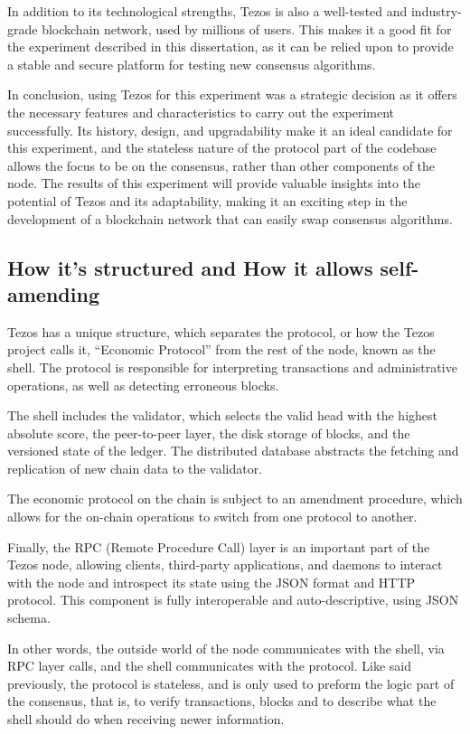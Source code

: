 In addition to its technological strengths, Tezos is also a well-tested and industry-grade blockchain network, used by millions of users. This makes it a good fit for the experiment described in this dissertation, as it can be relied upon to provide a stable and secure platform for testing new consensus algorithms.


In conclusion, using Tezos for this experiment was a strategic decision as it offers the necessary features and characteristics to carry out the experiment successfully. Its history, design, and upgradability make it an ideal candidate for this experiment, and the stateless nature of the protocol part of the codebase allows the focus to be on the consensus, rather than other components of the node.
The results of this experiment will provide valuable insights into the potential of Tezos and its adaptability, making it an exciting step in the development of a blockchain network that can easily swap consensus algorithms.



\subsection*{How it's structured and How it allows self-amending}

Tezos has a unique structure, which separates the protocol, or how the Tezos project calls it, ``Economic Protocol'' from the rest of the node, known as the shell. 
The protocol is responsible for interpreting transactions and administrative operations, as well as detecting erroneous blocks.

The shell includes the validator, which selects the valid head with the highest absolute score, the peer-to-peer layer, the disk storage of blocks, and the versioned state of the ledger. The distributed database abstracts the fetching and replication of new chain data to the validator.

The economic protocol on the chain is subject to an amendment procedure, which allows for the on-chain operations to switch from one protocol to another.

Finally, the RPC (Remote Procedure Call) layer is an important part of the Tezos node, allowing clients, third-party applications, and daemons to interact with the node and introspect its state using the JSON format and HTTP protocol. This component is fully interoperable and auto-descriptive, using JSON schema.

In other words, the outside world of the node communicates with the shell, via RPC layer calls, and the shell communicates with the protocol. Like said previously, the protocol is stateless, and is only used to preform the logic part of the consensus, that is, to verify transactions, blocks and to describe what the shell should do when receiving newer information.

